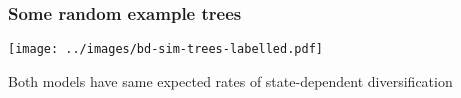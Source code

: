 \begin{frame}
    \frametitle{Some random example trees}

    \begin{center}
        \texttt{[image: ../images/bd-sim-trees-labelled.pdf]}

        Both models have same expected rates of state-dependent diversification

    \end{center}

\end{frame}
